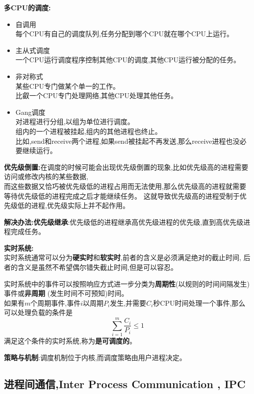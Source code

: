 \documentclass[UTF8,a4paper]{ctexart}
\newcommand{\spaceline}{\vspace{\baselineskip}}
\begin{document}
    \spaceline
    \textbf{多CPU的调度:}
    \begin{itemize}
      \item 自调用\\
      每个CPU有自己的调度队列,任务分配到哪个CPU就在哪个CPU上运行。
      \item 主从式调度\\
      一个CPU运行调度程序控制其他CPU的调度,其他CPU运行被分配的任务。
      \item 非对称式\\
      某些CPU专门做某个单一的工作。\\
      比叡一个CPU专门处理网络,其他CPU处理其他任务。
      \item Gang调度\\
      对进程进行分组,以组为单位进行调度。\\
      组内的一个进程被挂起,组内的其他进程也终止。\\
      比如,send和receive两个进程,如果send被挂起不再发送,那么receive进程也没必要继续运行。
    \end{itemize}

    \spaceline
    \textbf{优先级倒置:}在调度的时候可能会出现优先级倒置的现象,比如优先级高的进程需要访问或修改内核的某些数据,\\
    而这些数据又恰巧被优先级低的进程占用而无法使用,那么优先级高的进程就需要等待优先级低的进程完成之后才能继续任务。
    这就导致优先级高的进程受制于优先级低的进程,优先级实际上并不起作用。

    \textbf{解决办法:优先级继承}:优先级低的进程继承高优先级进程的优先级,直到高优先级进程完成任务。

    \spaceline
    \textbf{实时系统:}\\
    实时系统通常可以分为\textbf{硬实时}和\textbf{软实时},前者的含义是必须满足绝对的截止时间,
    后者的含义是虽然不希望偶尔错失截止时间,但是可以容忍。

    \spaceline
    实时系统中的事件可以按照响应方式进一步分类为\textbf{周期性}(以规则的时间间隔发生)事件或\textbf{非周期}
    (发生时间不可预知)时间。\\
    如果有$m$个周期事件,事件$i$以周期$P_i$发生,并需要$C_i$秒CPU时间处理一个事件,那么可以处理负载的条件是
    \[\sum_{i = 1}^m \frac{C_i}{P_i} \leq 1\]
    满足这个条件的实时系统,称为\textbf{是可调度的}。

    \spaceline
    \textbf{策略与机制}:调度机制位于内核,而调度策略由用户进程决定。

    \subsection{进程间通信,Inter Process Communication , IPC}
\end{document}
